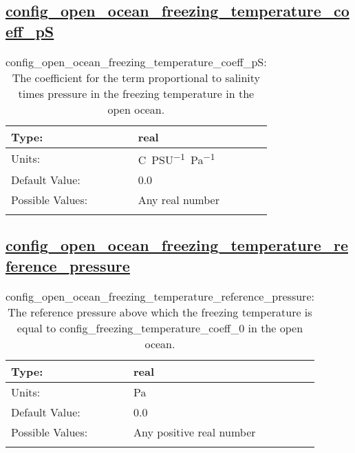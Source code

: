 \subsection[config\_open\_ocean\_freezing\_temperature\_coeff\_pS]{\hyperref[sec:nm_tab_eos]{config\_open\_ocean\_freezing\_temperature\_coeff\_pS}}
\label{subsec:nm_sec_config_open_ocean_freezing_temperature_coeff_pS}
\begin{center}
\begin{longtable}{| p{2.0in} || p{4.0in} |}
    \hline
    Type: & real \\
    \hline
    Units: & \si{C.PSU^{-1}.Pa^{-1}} \\
    \hline
    Default Value: & 0.0 \\
    \hline
    Possible Values: & Any real number \\
    \hline
    \caption{config\_open\_ocean\_freezing\_temperature\_coeff\_pS: The coefficient for the term proportional to salinity times pressure in the freezing temperature in the open ocean.}
\end{longtable}
\end{center}
\subsection[config\_open\_ocean\_freezing\_temperature\_reference\_pressure]{\hyperref[sec:nm_tab_eos]{config\_open\_ocean\_freezing\_temperature\_reference\_pressure}}
\label{subsec:nm_sec_config_open_ocean_freezing_temperature_reference_pressure}
\begin{center}
\begin{longtable}{| p{2.0in} || p{4.0in} |}
    \hline
    Type: & real \\
    \hline
    Units: & \si{Pa} \\
    \hline
    Default Value: & 0.0 \\
    \hline
    Possible Values: & Any positive real number \\
    \hline
    \caption{config\_open\_ocean\_freezing\_temperature\_reference\_pressure: The reference pressure above which the freezing temperature is equal to config\_freezing\_temperature\_coeff\_0 in the open ocean.}
\end{longtable}
\end{center}
